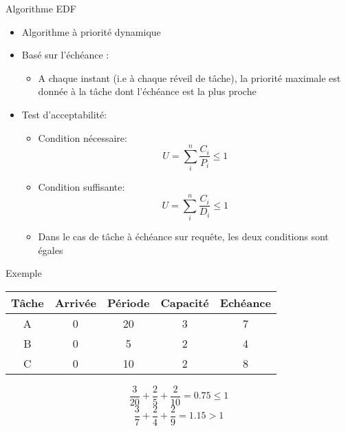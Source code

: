 \begin{frame}{Algorithme EDF}
  \begin{itemize}
  \item Algorithme à priorité dynamique
  \item Basé sur l'échéance :
    \begin{itemize}
    \item A chaque instant (i.e à chaque réveil de tâche), la priorité
      maximale  est donnée  à la  tâche  dont l'échéance  est la  plus
      proche
    \end{itemize}
  \item Test d'acceptabilité:
    \begin{itemize}
    \item Condition nécessaire:
      $$U = \sum_i^n \frac{C_i}{P_i} \leq 1$$
    \item Condition suffisante:
      $$U = \sum_i^n \frac{C_i}{D_i} \leq 1$$
    \item  Dans le  cas  de tâche  à  échéance sur  requête, les  deux
      conditions sont égales
    \end{itemize}
  \end{itemize}
\end{frame}

\begin{frame}{Exemple}
  \begin{center}
    \begin{tabular}{ccccc}
      \hline
      Tâche & Arrivée & Période & Capacité & Echéance \\
      \hline
      A & 0 & 20 & 3 & 7\\
      B & 0 &  5 & 2 & 4\\
      C & 0 & 10 & 2 & 8\\
      \hline
    \end{tabular}
  \end{center}
    $$\frac{3}{20} + \frac{2}{5} + \frac{2}{10} = 0.75 \leq 1$$
    $$\frac{3}{7} + \frac{2}{4} + \frac{2}{9} = 1.15 > 1$$
\end{frame} 
  
